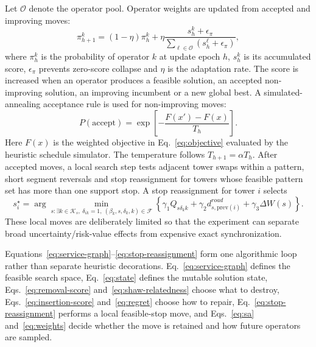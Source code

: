 Let $\mathcal{O}$ denote the operator pool. Operator weights are updated from accepted and improving moves:
\begin{equation}
\pi^{k}_{h+1}=(1-\eta)\pi^k_h+\eta\frac{s^k_h+\epsilon_\pi}{\sum_{\ell\in\mathcal{O}}(s^\ell_h+\epsilon_\pi)},
\label{eq:weights}
\end{equation}
where $\pi^k_h$ is the probability of operator $k$ at update epoch $h$, $s^k_h$ is its accumulated score, $\epsilon_\pi$ prevents zero-score collapse and $\eta$ is the adaptation rate. The score is increased when an operator produces a feasible solution, an accepted non-improving solution, an improving incumbent or a new global best. A simulated-annealing acceptance rule is used for non-improving moves:
\begin{equation}
P(\mathrm{accept})=\exp\left[-\frac{F(x')-F(x)}{T_h}\right].
\label{eq:sa}
\end{equation}
Here $F(x)$ is the weighted objective in Eq.~\eqref{eq:objective} evaluated by the heuristic schedule simulator. The temperature follows $T_{h+1}=\alpha T_h$. After accepted moves, a local search step tests adjacent tower swaps within a pattern, short segment reversals and stop reassignment for towers whose feasible pattern set has more than one support stop. A stop reassignment for tower $i$ selects
\begin{equation}
s_i^\star=\arg\min_{s:\exists k\in\mathcal{K}_s,\ \delta_{ik}=1,\ (\beta_k,s,\delta_k,k)\in\mathcal{F}}
\left\{\gamma_1 Q_{s\delta_k k}+\gamma_2 d^{road}_{s,\mathrm{prev}(i)}+\gamma_3\Delta W(s)\right\}.
\label{eq:stop-reassignment}
\end{equation}
These local moves are deliberately limited so that the experiment can separate broad uncertainty/risk-value effects from expensive exact synchronization.

Equations~\eqref{eq:service-graph}--\eqref{eq:stop-reassignment} form one algorithmic loop rather than separate heuristic decorations. Eq.~\eqref{eq:service-graph} defines the feasible search space, Eq.~\eqref{eq:state} defines the mutable solution state, Eqs.~\eqref{eq:removal-score} and~\eqref{eq:shaw-relatedness} choose what to destroy, Eqs.~\eqref{eq:insertion-score} and~\eqref{eq:regret} choose how to repair, Eq.~\eqref{eq:stop-reassignment} performs a local feasible-stop move, and Eqs.~\eqref{eq:sa} and~\eqref{eq:weights} decide whether the move is retained and how future operators are sampled.

